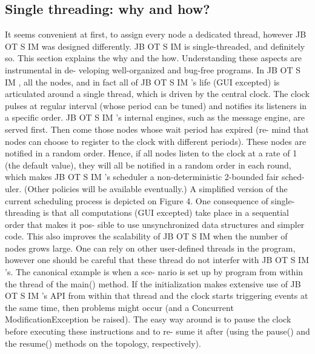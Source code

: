 \subsection{Single threading: why and how?}
It seems convenient at first, to assign every node a dedicated
thread, however JB OT S IM was designed differently. JB OT S IM is
single-threaded, and definitely so. This section explains the why
and the how. Understanding these aspects are instrumental in de-
veloping well-organized and bug-free programs.
In JB OT S IM , all the nodes, and in fact all of JB OT S IM ’s life
(GUI excepted) is articulated around a single thread, which is driven
by the central clock. The clock pulses at regular interval (whose
period can be tuned) and notifies its listeners in a specific order.
JB OT S IM ’s internal engines, such as the message engine, are served
first. Then come those nodes whose wait period has expired (re-
mind that nodes can choose to register to the clock with different
periods). These nodes are notified in a random order. Hence, if
all nodes listen to the clock at a rate of 1 (the default value), they
will all be notified in a random order in each round, which makes
JB OT S IM ’s scheduler a non-deterministic 2-bounded fair sched-
uler. (Other policies will be available eventually.) A simplified
version of the current scheduling process is depicted on Figure 4.
One consequence of single-threading is that all computations
(GUI excepted) take place in a sequential order that makes it pos-
sible to use unsynchronized data structures and simpler code. This
also improves the scalability of JB OT S IM when the number of
nodes grows large. One can rely on other user-defined threads in
the program, however one should be careful that these thread do not
interfer with JB OT S IM ’s. The canonical example is when a sce-
nario is set up by program from within the thread of the main()
method. If the initialization makes extensive use of JB OT S IM ’s
API from within that thread and the clock starts triggering events
at the same time, then problems might occur (and a Concurrent
ModificationException be raised). The easy way around
is to pause the clock before executing these instructions and to re-
sume it after (using the pause() and the resume() methods on
the topology, respectively).
